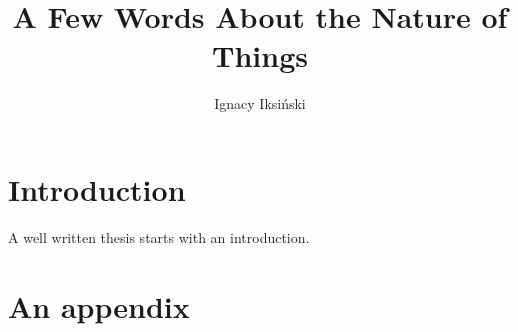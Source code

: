 \documentclass[pl]{ppfcmthesis}
\author{Ignacy Iksiński}
\title{A Few Words About the Nature of Things}
\begin{document}
\maketitle

\frontmatter%

% 

\mainmatter%

\chapter{Introduction}
A well written thesis starts with an introduction.

%
{\small}

\backmatter%

\chapter{An appendix}
\end{document}
